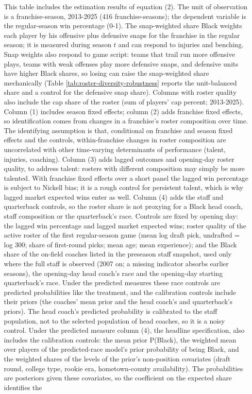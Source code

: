 \begin{table}[!h]
{\begin{threeparttable}
\begin{tablenotes}[para]
\item This table includes the estimation results of equation (2). The unit of observation is a franchise-season, 2013-2025 (416 franchise-seasons); the dependent variable is the regular-season win percentage (0-1). The snap-weighted share Black weights each player by his offensive plus defensive snaps for the franchise in the regular season; it is measured during season $t$ and can respond to injuries and benching. Snap weights also respond to game script: teams that trail run more offensive plays, teams with weak offenses play more defensive snaps, and defensive units have higher Black shares, so losing can raise the snap-weighted share mechanically (Table \ref{tab:roster-diversity-robustness} reports the unit-balanced share and a control for the defensive snap share). Columns with roster quality also include the cap share of the roster (sum of players' cap percent; 2013-2025). Column (1) includes season fixed effects; column (2) adds franchise fixed effects, so identification comes from changes in a franchise's roster composition over time. The identifying assumption is that, conditional on franchise and season fixed effects and the controls, within-franchise changes in roster composition are uncorrelated with other time-varying determinants of performance (talent, injuries, coaching). Column (3) adds lagged outcomes and opening-day roster quality, to address talent: rosters with different composition may simply be more talented. With franchise fixed effects over a short panel the lagged win percentage is subject to Nickell bias; it is a rough control for persistent talent, which is why lagged market expected wins enter as well. Column (4) adds the staff and quarterback controls, so the roster share is not proxying for a Black head coach, staff composition or the quarterback's race. Controls are fixed by opening day: the lagged win percentage and lagged market expected wins; roster quality of the active roster of the first regular-season game (mean log draft pick, undrafted = log 300; share of first-round picks; mean age; mean experience); and the Black share of the on-field coaches listed in the preseason staff snapshot, used only where the full staff is observed (2007 on; a missing indicator absorbs earlier seasons), the opening-day head coach's race and the opening-day starting quarterback's race. Under the predicted measures these race controls are predicted probabilities like the treatment, and the calibration controls include their priors (the coaches' mean prior and the head coach's and quarterback's priors). The head coach's predicted probability is calibrated to the staff population, not to the selected population of head coaches, so it is a noisy control. Under the predicted measure column (4), the headline specification, also includes the calibration controls: the mean prior P(Black), the weighted mean over players of the predicted-race model's prior probability of being Black, and the weighted shares of the levels of the prior's non-position covariates (draft round, college type, rookie era, hometown-county availability). The probabilities are posteriors given these covariates, so the coefficient on the expected share identifies the 
\end{tablenotes}
\end{threeparttable}}
\end{table}
